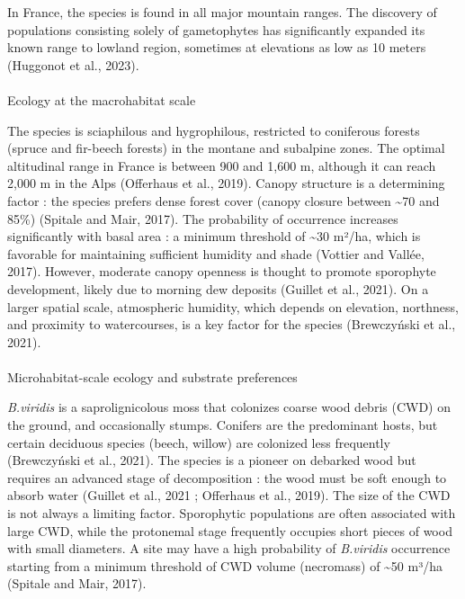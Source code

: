 \documentclass[
  letterpaper,
  DIV=11,
  numbers=noendperiod]{scrartcl}
\makeatletter
\let\oldparagraph\paragraph
\renewcommand{\paragraph}{
    \@ifstar
      \xxxParagraphStar
      \xxxParagraphNoStar
  }
\newcommand{\xxxParagraphStar}[1]{\oldparagraph*{#1}\mbox{}}
\newcommand{\xxxParagraphNoStar}[1]{\oldparagraph{#1}\mbox{}}
\makeatother
\begin{document}
In France, the species is found in all major mountain ranges. The
discovery of populations consisting solely of gametophytes has
significantly expanded its known range to lowland region, sometimes at
elevations as low as 10 meters (Huggonot et al., 2023).

\paragraph{Ecology at the macrohabitat
scale}\label{ecology-at-the-macrohabitat-scale}

The species is sciaphilous and hygrophilous, restricted to coniferous
forests (spruce and fir-beech forests) in the montane and subalpine
zones. The optimal altitudinal range in France is between 900 and 1,600
m, although it can reach 2,000 m in the Alps (Offerhaus et al., 2019).
Canopy structure is a determining factor : the species prefers dense
forest cover (canopy closure between \textasciitilde70 and 85\%)
(Spitale and Mair, 2017). The probability of occurrence increases
significantly with basal area : a minimum threshold of \textasciitilde30
m²/ha, which is favorable for maintaining sufficient humidity and shade
(Vottier and Vallée, 2017). However, moderate canopy openness is thought
to promote sporophyte development, likely due to morning dew deposits
(Guillet et al., 2021). On a larger spatial scale, atmospheric humidity,
which depends on elevation, northness, and proximity to watercourses, is
a key factor for the species (Brewczyński et al., 2021).

\paragraph{Microhabitat-scale ecology and substrate
preferences}\label{microhabitat-scale-ecology-and-substrate-preferences}

\emph{B.viridis} is a saprolignicolous moss that colonizes coarse wood
debris (CWD) on the ground, and occasionally stumps. Conifers are the
predominant hosts, but certain deciduous species (beech, willow) are
colonized less frequently (Brewczyński et al., 2021). The species is a
pioneer on debarked wood but requires an advanced stage of decomposition
: the wood must be soft enough to absorb water (Guillet et al., 2021 ;
Offerhaus et al., 2019). The size of the CWD is not always a limiting
factor. Sporophytic populations are often associated with large CWD,
while the protonemal stage frequently occupies short pieces of wood with
small diameters. A site may have a high probability of \emph{B.viridis}
occurrence starting from a minimum threshold of CWD volume (necromass)
of \textasciitilde50 m³/ha (Spitale and Mair, 2017).
\end{document}

